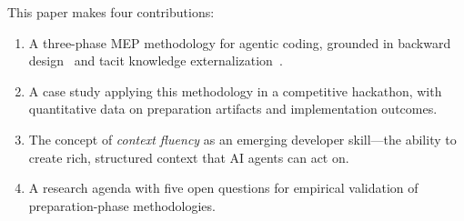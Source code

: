 This paper makes four contributions:
\begin{enumerate}
  \item A three-phase MEP methodology for agentic coding, grounded
    in backward design~\cite{wiggins1998understanding} and tacit knowledge
    externalization~\cite{polanyi1966tacit}.
  \item A case study applying this methodology in a competitive hackathon,
    with quantitative data on preparation artifacts and implementation
    outcomes.
  \item The concept of \emph{context fluency} as an emerging developer
    skill---the ability to create rich, structured context that AI agents can
    act on.
  \item A research agenda with five open questions for empirical validation
    of preparation-phase methodologies.
\end{enumerate}
